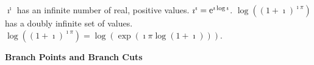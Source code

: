 {\begin{Hint}
  \label{hint cosh ip i2}
\end{Hint}




\begin{Hint}
  \label{hint ii log1i}
  $\imath^\imath$ has an infinite number of real, positive values.  $\imath^\imath = \mathop{\mathrm{e}}\nolimits^{\imath \log \imath}$.
  $\log\left( (1 + \imath)^{\imath \pi} \right)$ has a doubly infinite set of values.
  $\log\left( (1 + \imath)^{\imath \pi} \right) = \log( \exp( \imath \pi \log(1 + \imath) ) )$.
\end{Hint}










\begin{Hint}
  \label{hint ez = i}
\end{Hint}





\begin{Hint}
  \label{hint arctan z}
\end{Hint}



\begin{large}
  \noindent
  \textbf{Branch Points and Branch Cuts}
\end{large}


\begin{Hint}
  \label{hint log zz+1z-1}
\end{Hint}





\begin{Hint}
  \label{hint z3 z2 6z 12}
\end{Hint}






\begin{Hint}
  \label{hint mapping z13}
\end{Hint}




}
